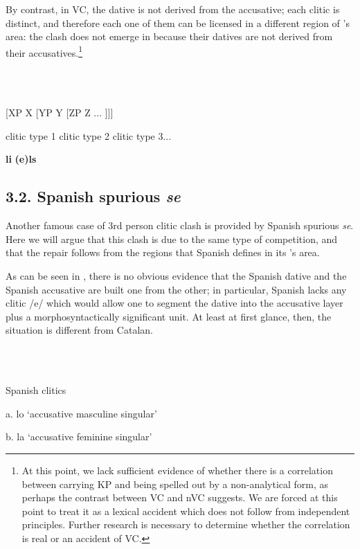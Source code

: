 \documentclass[output=paper,colorlinks,citecolor=brown]{./langscibook}
\begin{document}
By contrast, in VC, the dative is not derived from the accusative; each clitic is distinct, and therefore each one of them can be licensed in a different region of \citeauthor{Sportiche1996}’s area: the clash does not emerge in  because their datives are not derived from their accusatives.\footnote{At this point, we lack sufficient evidence of whether there is a correlation between carrying KP and being spelled out by a non-analytical form, as perhaps the contrast between VC and nVC suggests. We are forced at this point to treat it as a lexical accident which does not follow from independent principles. Further research is necessary to determine whether the correlation is real or an accident of VC.}

\ea%
    \label{ex:key:17}
    \gll\\
        \\
    \glt
    \z

         [XP    X  [YP    Y  [ZP  Z  ...  ]]]

     clitic type 1  clitic type 2    clitic type 3...

        \textbf{li}      \textbf{(e)ls}

\subsection{3.2. Spanish spurious \textit{se}}

An\-\-\-other famous case of 3rd person clitic clash is provided by Spanish spurious \textit{se}. Here we will argue that this clash is due to the same type of competition, and that the repair follows from the regions that Spanish defines in its \citeauthor{Sportiche1996}’s area.

As can be seen in , there is no obvious evidence that the Spanish dative and the Spanish accusative are built one from the other; in particular, Spanish lacks any clitic /e/ which would allow one to segment the dative into the accusative layer plus a morphosyntactically significant unit. At least at first glance, then, the situation is different from Catalan.

\ea%
    \label{ex:key:18}
    \gll\\
        \\
    \glt
    \z

         Spanish clitics

  a. lo ‘accusative masculine singular’

  b. la ‘accusative feminine singular’
\end{document}
